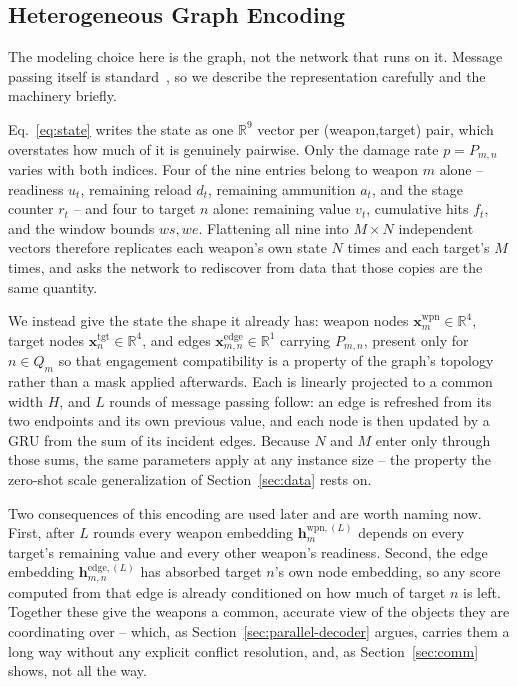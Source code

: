 \subsection{Heterogeneous Graph Encoding}
\label{sec:encoding}

The modeling choice here is the graph, not the network that runs on it. Message passing itself is standard~\cite{gilmer2017neural}, so we describe the representation carefully and the machinery briefly.

Eq.~\eqref{eq:state} writes the state as one $\mathbb{R}^9$ vector per (weapon,target) pair, which overstates how much of it is genuinely pairwise. Only the damage rate $p = P_{m,n}$ varies with both indices. Four of the nine entries belong to weapon $m$ alone -- readiness $u_t$, remaining reload $d_t$, remaining ammunition $a_t$, and the stage counter $r_t$
-- and four to target $n$ alone: remaining value $v_t$, cumulative hits $f_t$, and the window bounds $ws, we$. Flattening all nine into $M \times N$ independent vectors therefore replicates each weapon's own state $N$ times and each target's $M$ times, and asks the network to rediscover from data that those copies are the same quantity.

We instead give the state the shape it already has: weapon nodes $\bm{x}_m^{\text{wpn}} \in \mathbb{R}^4$, target nodes $\bm{x}_n^{\text{tgt}} \in \mathbb{R}^4$, and edges $\bm{x}_{m,n}^{\text{edge}} \in \mathbb{R}^1$ carrying $P_{m,n}$, present only for $n \in Q_m$ so that engagement compatibility is a property of the graph's topology rather than a mask applied afterwards. Each is linearly projected to a common width $H$, and $L$ rounds of message passing follow: an edge is refreshed from its two endpoints and its own previous value, and each node is then updated by a GRU from the sum of its incident edges. Because $N$ and $M$ enter only through those sums, the same parameters apply at any instance size -- the property the zero-shot scale generalization of Section~\ref{sec:data} rests on.

Two consequences of this encoding are used later and are worth naming now. First, after $L$ rounds every weapon embedding $\bm{h}_m^{\text{wpn},(L)}$ depends on every target's remaining value and every other weapon's readiness. Second, the edge embedding $\bm{h}_{m,n}^{\text{edge},(L)}$ has absorbed target $n$'s own node embedding, so any score computed from that edge is already conditioned on how much of target $n$ is left. Together these give the weapons a common, accurate view of the objects they are coordinating over -- which, as Section~\ref{sec:parallel-decoder} argues, carries them a long way without any explicit conflict resolution, and, as Section~\ref{sec:comm} shows, not all the way.

